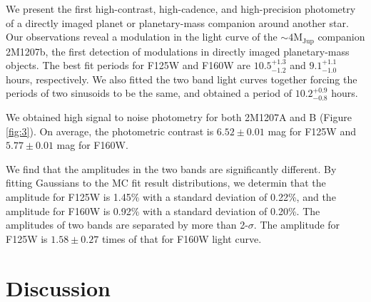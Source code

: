 \documentclass[apj]{emulateapj}
\begin{document}
We present the first high-contrast, high-cadence, and high-precision
photometry of a directly imaged planet or planetary-mass
companion around another star. Our observations reveal a modulation in the light curve of
the $\sim 4 \mathrm{M_{{Jup}}}$ companion 2M1207b, the first detection
of modulations in directly imaged planetary-mass objects.  The best
fit periods for F125W and F160W are $10.5_{-1.2}^{+1.3}$ and $9.1_{-1.0}^{+1.1}$ hours,
respectively. We also fitted the two band light curves together forcing the
periods of two sinusoids to be the same, and obtained a period
of $10.2^{+0.9}_{-0.8}$ hours. 

We obtained high signal to noise photometry for both 2M1207A
and B (Figure \ref{fig:3}). On average, the photometric contrast is
$6.52\pm0.01$ mag for F125W and $5.77\pm0.01$ mag for F160W.



We find that the amplitudes in the two bands are
significantly different. By fitting Gaussians to the MC fit result
distributions, we determin that the  amplitude for F125W is
1.45\% with a standard deviation of 0.22\%, and  the amplitude for F160W is
0.92\% with a standard deviation of 0.20\%. The amplitudes of two
bands are separated by more than 2-$\sigma$. The amplitude
for F125W is $1.58\pm0.27$ times of that for F160W light curve.


\section{Discussion}
\end{document}
